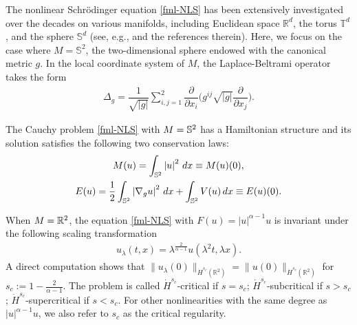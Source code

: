 \documentclass[10pt,a4paper]{amsart}
\numberwithin{equation}{section}
\newcommand{\R}{\Bbb R}
\begin{document}
The nonlinear Schr\"odinger equation \eqref{fml-NLS} has been extensively investigated over the decades on various manifolds, including Euclidean space $\mathbb{R}^d$, the torus $\mathbb{T}^d$, and the sphere $\mathbb{S}^d$ (see, e.g., \cite{Bour,Burq1,Burq2,Caze,HTT-Duke,KM,KV1,Pausader,Tao} and the references therein). Here, we focus on the case where $M = \mathbb{S}^2$, the two-dimensional sphere endowed with the canonical metric $g$.
In the local coordinate system of $M$, the Laplace-Beltrami operator takes the form
\begin{align*}
\Delta_g=\dfrac{1}{\sqrt{|g|}}\sum\limits_{i,j=1}^2\dfrac{\partial}{\partial x_i}\Big(g^{ij}\sqrt{|g|}\dfrac\partial{\partial x_j}\Big).
\end{align*}
	
	
The Cauchy problem \eqref{fml-NLS} with $M=\Bbb S^2$ has a Hamiltonian structure and its solution satisfies the following two conservation laws:
\begin{gather}\label{mass}
M(u)=\int_{\Bbb{S}^2}\left|u\right|^2\,dx \equiv M(u)(0),  \\
E(u)=\frac12\int_{\Bbb{S}^2}\left|\nabla_g u\right|^2\,dx+{\int_{\Bbb{S}^2}V(u)\,dx} \equiv E(u)(0).\label{energy}
\end{gather}
	
When $M=\R^2$, the equation \eqref{fml-NLS} with $F(u)=|u|^{\alpha-1}u$ is invariant under the following scaling transformation
\begin{align*}
u_\lambda(t,x)=\lambda^\frac{2}{\alpha-1}u(\lambda^2t,\lambda x).
\end{align*}
A direct computation shows that $\|u_\lambda(0)\|_{\dot H^{s_c}(\mathbb{R}^2)} = \|u(0)\|_{\dot H^{s_c}(\mathbb{R}^2)}$ for $s_c := 1 - \frac{2}{\alpha-1}$. The problem is called $\dot H^{s_c}$-critical if $s=s_c$;  $\dot H^{s_c}$-subcritical if $s>s_c$;  $\dot H^{s_c}$-supercritical if $s<s_c$. For other nonlinearities with the same degree as $|u|^{\alpha-1}u$, we also refer  to $s_c$ as the critical regularity. 	
	
\end{document}
